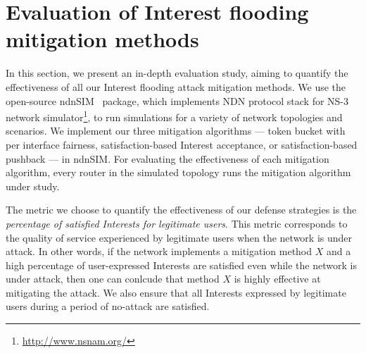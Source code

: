\section{Evaluation of Interest flooding mitigation methods}
\label{sec:evaluation}




In this section, we present an in-depth evaluation study, aiming to quantify the effectiveness of all our Interest flooding attack mitigation methods.
We use the open-source ndnSIM~\cite{ndnsim} package, which implements NDN protocol stack for NS-3 network simulator\footnote{\url{http://www.nsnam.org/}}, to run simulations for a variety of network topologies and scenarios. We implement our three mitigation algorithms --- token bucket with per interface fairness, satisfaction-based Interest acceptance, or satisfaction-based pushback --- in ndnSIM. For evaluating the effectiveness of each mitigation algorithm, every router in the simulated topology runs the mitigation algorithm under study.



The metric we choose to quantify the effectiveness of our defense strategies is the {\it percentage of satisfied Interests for legitimate users}. This metric corresponds to the quality of service experienced by legitimate users when the network is under attack. In other words, if the network implements a mitigation method $X$ and a high percentage of user-expressed Interests are satisfied even while the network is under attack, then one can conlcude that method $X$ is highly effective at mitigating the attack. We also ensure that all Interests expressed by legitimate users during a period of no-attack are satisfied.
 
